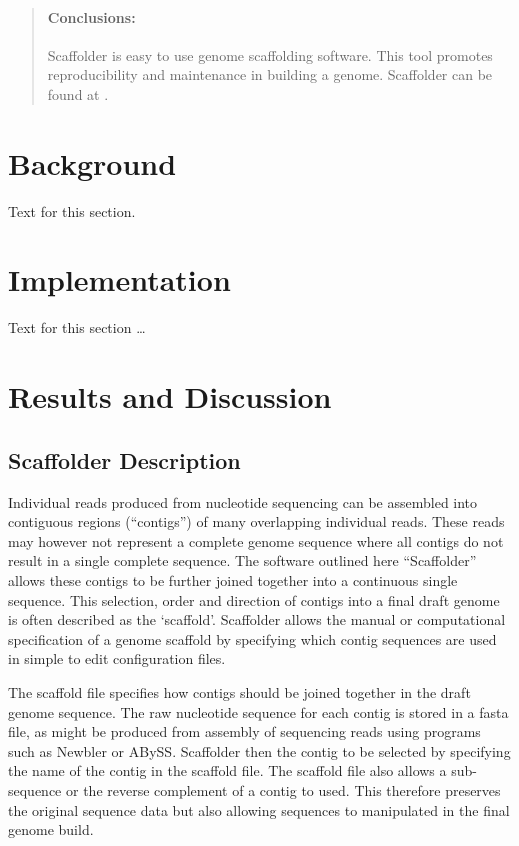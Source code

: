 \documentclass[10pt]{bmc_article}
\newenvironment{bmcformat}{\begin{raggedright}\baselineskip20pt\sloppy\setboolean{publ}{false}}{\end{raggedright}\baselineskip20pt\sloppy}
\begin{document}
\begin{bmcformat}
\begin{abstract}
  \paragraph*{Conclusions:} Scaffolder is easy to use genome scaffolding
  software. This tool promotes reproducibility and maintenance in building
  a genome. Scaffolder can be found at \scaffolder.

\end{abstract}


\section*{Background}
 Text for this section.\cite{koon,oreg,khar,zvai,xjon,schn,pond,smith,marg,hunn,advi,koha,mouse}
\section*{Implementation}
  Text for this section \ldots
\section*{Results and Discussion} %

\subsection*{Scaffolder Description} %

Individual reads produced from nucleotide sequencing can be assembled into
contiguous regions (``contigs'') of many overlapping individual reads. These
reads may however not represent a complete genome sequence where all contigs do
not result in a single complete sequence. The software outlined here
``Scaffolder'' allows these contigs to be further joined together into
a continuous single sequence. This selection, order and direction of contigs
into a final draft genome is often described as the `scaffold'. Scaffolder
allows the manual or computational specification of a genome scaffold by
specifying which contig sequences are used in simple to edit configuration
files. \pb

The scaffold file specifies how contigs should be joined together in the draft
genome sequence. The raw nucleotide sequence for each contig is stored in
a fasta file, as might be produced from assembly of sequencing reads using
programs such as Newbler\cite{miller2010} or ABySS\cite{simpson2009}.
Scaffolder then the contig to be selected by specifying the name of the contig
in the scaffold file. The scaffold file also allows a sub-sequence or the
reverse complement of a contig to used. This therefore preserves the original
sequence data but also allowing sequences to manipulated in the final genome
build. \pb


\end{bmcformat}
\end{document}
